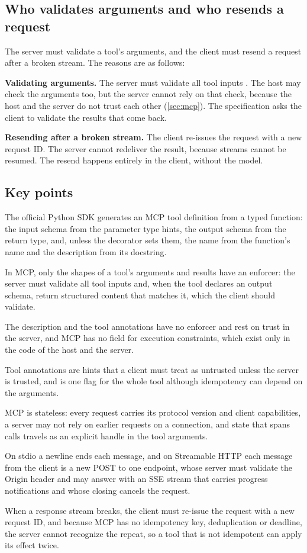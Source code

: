 \subsection{Who validates arguments and who resends a request}
\label{sec:mcpcontract-who}

The server must validate a tool's arguments, and the client must resend a request after a broken
stream. The reasons are as follows:
\bi
\item \textbf{Validating arguments.} The server must validate all tool inputs
\citep{mcp-spec-2026}. The host may check the arguments too, but the server cannot rely on
that check, because the host and the server do not trust each other (\cref{sec:mcp}). The
specification asks the client to validate the results that come back.
\item \textbf{Resending after a broken stream.} The client re-issues the request with a new request
ID. The server cannot redeliver the result, because streams cannot be resumed. The resend happens
entirely in the client, without the model.
\ei

\subsection*{Key points}
\bi
\item The official Python SDK generates an MCP tool definition from a typed function: the input
schema from the parameter type hints, the output schema from the return type, and, unless the
decorator sets them, the name from the function's name and the description from its docstring.
\item In MCP, only the shapes of a tool's arguments and results have an enforcer: the server must
validate all tool inputs and, when the tool declares an output schema, return structured content
that matches it, which the client should validate.
\item The description and the tool annotations have no enforcer and rest on trust in the server,
and MCP has no field for execution constraints, which exist only in the code of the host and the
server.
\item Tool annotations are hints that a client must treat as untrusted unless the server is trusted,
and  is one flag for the whole tool although idempotency can depend on the
arguments.
\item MCP is stateless: every request carries its protocol version and client capabilities, a server
may not rely on earlier requests on a connection, and state that spans calls travels as an explicit
handle in the tool arguments.
\item On stdio a newline ends each message, and on Streamable HTTP each message from the client is a
new POST to one endpoint, whose server must validate the Origin header and may answer with an SSE stream that
carries progress notifications and whose closing cancels the request.
\item When a response stream breaks, the client must re-issue the request with a new request ID, and
because MCP has no idempotency key, deduplication or deadline, the server cannot recognize the
repeat, so a tool that is not idempotent can apply its effect twice.
\ei
